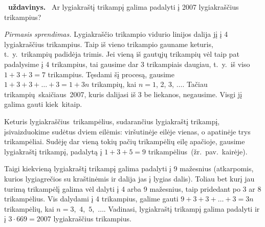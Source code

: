 \documentclass[11pt,a4paper]{article}
\newcounter{uzdavinys}
\newenvironment{uzdavinys}
  {\refstepcounter{uzdavinys}\par\medskip\noindent\textbf{\theuzdavinys\ uždavinys.}\ }
  {\par\medskip}
\begin{document}
\begin{uzdavinys}
Ar lygiakraštį trikampį galima padalyti į 2007 lygiakraščius trikampius?
\end{uzdavinys}

\textit{Pirmasis sprendimas.} Lygiakraščio trikampio vidurio linijos dalija jį į 4 lygiakraščius trikampius. Taip iš vieno trikampio gauname keturis, t.~y.~trikampių padidėja trimis. Jei vieną iš gautųjų trikampių vėl taip pat padalysime į 4 trikampius, tai gausime dar 3 trikampiais daugiau, t.~y.~iš viso $1+3+3=7$ trikampius. Tęsdami šį procesą, gausime $1+3+3+\ldots+3=1+3n$ trikampių, kai $n=1$, 2, 3, $\ldots$. Tačiau trikampių~skai\-čiaus~2007, kuris dalijasi iš 3 be liekanos, negausime. Visgi jį galima gauti kiek~\mbox{kitaip}.

Keturis lygiakraščius~trikam\-pėlius, sudarančius lygiakraštį trikampį, įsivaizduokime sudėtus dviem eilėmis: viršutinėje eilėje vienas, o apatinėje trys trikampėliai. Sudėję dar vieną tokių pačių trikampėlių eilę apačioje, gausime lygiakraštį trikampį, padalytą į $1+3+5=9$ trikampėlius~(žr.~pav.~kairėje).
 
Taigi kiekvieną lygiakraštį trikampį galima padalyti į 9 mažesnius (atkarpomis, kurios lygiagrečios su kraštinėmis ir dalija jas į lygias dalis). Toliau bet kurį jau turimą trikampėlį galima vėl dalyti į 4 arba 9 mažesnius, taip pridedant po 3 ar 8 trikampėlius. Vis dalydami į 4 trikampius, galime gauti $9+3+3+\ldots+3=3n$ trikampėlių, kai $n=3$,~$4$,~$5$,~$\ldots$. Vadinasi, lygiakraštį trikampį galima padalyti ir į $3\cdot669=2007$ lygiakraščius trikampius. 

\vspace{-0mm}
\begin{center}
\end{center}
\vspace{-1mm}
\end{document}
